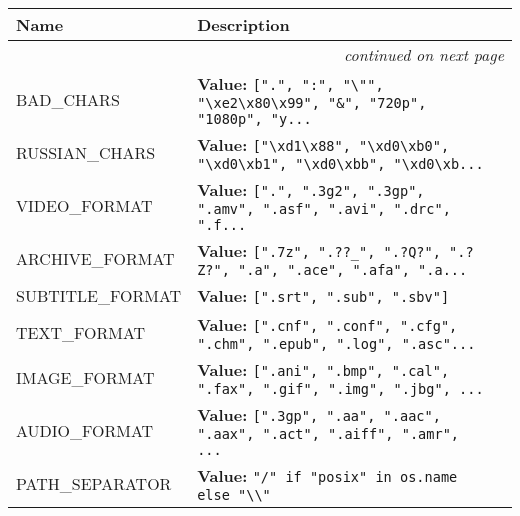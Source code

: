     \vspace{-1cm}
\hspace{\varindent}\begin{longtable}{|p{\varnamewidth}|p{\vardescrwidth}|l}
\cline{1-2}
\cline{1-2} \centering \textbf{Name} & \centering \textbf{Description}& \\
\cline{1-2}
\endhead\cline{1-2}\multicolumn{3}{r}{\small\textit{continued on next page}}\\\endfoot\cline{1-2}
\endlastfoot\raggedright B\-A\-D\-\_\-C\-H\-A\-R\-S\- & \raggedright \textbf{Value:} 
{\tt [".", ":", "{\textbackslash}"", "{\textbackslash}xe2{\textbackslash}x80{\textbackslash}x99", "\&", "720p", "1080p", "y\texttt{...}}&\\
\cline{1-2}
\raggedright R\-U\-S\-S\-I\-A\-N\-\_\-C\-H\-A\-R\-S\- & \raggedright \textbf{Value:} 
{\tt ["{\textbackslash}xd1{\textbackslash}x88", "{\textbackslash}xd0{\textbackslash}xb0", "{\textbackslash}xd0{\textbackslash}xb1", "{\textbackslash}xd0{\textbackslash}xbb", "{\textbackslash}xd0{\textbackslash}xb\texttt{...}}&\\
\cline{1-2}
\raggedright V\-I\-D\-E\-O\-\_\-F\-O\-R\-M\-A\-T\- & \raggedright \textbf{Value:} 
{\tt [".", ".3g2", ".3gp", ".amv", ".asf", ".avi", ".drc", ".f\texttt{...}}&\\
\cline{1-2}
\raggedright A\-R\-C\-H\-I\-V\-E\-\_\-F\-O\-R\-M\-A\-T\- & \raggedright \textbf{Value:} 
{\tt [".7z", ".??\_", ".?Q?", ".?Z?", ".a", ".ace", ".afa", ".a\texttt{...}}&\\
\cline{1-2}
\raggedright S\-U\-B\-T\-I\-T\-L\-E\-\_\-F\-O\-R\-M\-A\-T\- & \raggedright \textbf{Value:} 
{\tt [".srt", ".sub", ".sbv"]}&\\
\cline{1-2}
\raggedright T\-E\-X\-T\-\_\-F\-O\-R\-M\-A\-T\- & \raggedright \textbf{Value:} 
{\tt [".cnf", ".conf", ".cfg", ".chm", ".epub", ".log", ".asc"\texttt{...}}&\\
\cline{1-2}
\raggedright I\-M\-A\-G\-E\-\_\-F\-O\-R\-M\-A\-T\- & \raggedright \textbf{Value:} 
{\tt [".ani", ".bmp", ".cal", ".fax", ".gif", ".img", ".jbg", \texttt{...}}&\\
\cline{1-2}
\raggedright A\-U\-D\-I\-O\-\_\-F\-O\-R\-M\-A\-T\- & \raggedright \textbf{Value:} 
{\tt [".3gp", ".aa", ".aac", ".aax", ".act", ".aiff", ".amr", \texttt{...}}&\\
\cline{1-2}
\raggedright P\-A\-T\-H\-\_\-S\-E\-P\-A\-R\-A\-T\-O\-R\- & \raggedright \textbf{Value:} 
{\tt "/" if "posix" in os.name else "{\textbackslash}{\textbackslash}"}&\\
\cline{1-2}
\end{longtable}


